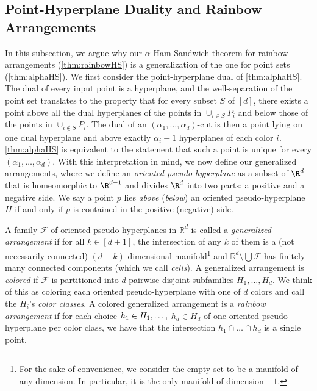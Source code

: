 \subsection{Point-Hyperplane Duality and Rainbow Arrangements}
\label{sec:rainbow_definition}
%
In this subsection, we argue why our $\alpha$-Ham-Sandwich theorem for rainbow arrangements (\cref{thm:rainbowHS}) is a generalization of the one for point sets (\cref{thm:alphaHS}).
We first consider the point-hyperplane dual of \cref{thm:alphaHS}.
The dual of every input point is a hyperplane, and the well-separation of the point set translates to the property that for every subset $S$ of $[d]$, there exists a point above all the dual hyperplanes of the points in $\cup_{i \in S} P_i$ and below those of the points in $\cup_{i \notin S} P_i$.
The dual of an $(\alpha_1, \dots, \alpha_d)$-cut is then a point lying on one dual hyperplane and above exactly $\alpha_i-1$ hyperplanes of each color $i$.
\cref{thm:alphaHS} is equivalent to the statement that such a point is unique for every $(\alpha_1, \dots, \alpha_d)$.
%
With this interpretation in mind, we now define our generalized arrangements, where we define an \emph{oriented pseudo-hyperplane} as a subset of $\R^d$ that is homeomorphic to $\R^{d - 1}$ and divides $\R^d$ into two parts: a positive and a negative side. We say a point $p$ lies \emph{above} (\emph{below}) an oriented pseudo-hyperplane $H$ if and only if $p$ is contained in the positive (negative) side.
%
\begin{definition}
\label{def:generalized_arrangments}
A family $\mathcal{F}$ of oriented pseudo-hyperplanes in $\mathbb{R}^d$ is called a \emph{generalized arrangement} if for all $k \in [d + 1]$, the intersection of any $k$ of them is a (not necessarily connected) $(d-k)$-dimensional manifold\footnote{For the sake of convenience, we consider the empty set to be a manifold of any dimension. In particular, it is the only manifold of dimension $-1$.} and $\mathbb{R}^d\setminus\bigcup\mathcal{F}$ has finitely many connected components (which we call \emph{cells}).
%
A generalized arrangement is \emph{colored} if $\mathcal{F}$ is partitioned into $d$ pairwise disjoint subfamilies $H_1,\ldots,H_d$. We think of this as coloring each oriented pseudo-hyperplane with one of $d$ colors and call the $H_i$'s \emph{color classes}.
%
A colored generalized arrangement is a \emph{rainbow arrangement} if for each choice $h_1\in \nolinebreak H_1,\ldots,$ $h_d\in H_d$ of one oriented pseudo-hyperplane per color class, we have that the intersection $h_1\cap\ldots\cap h_d$ is a single point.
\end{definition}
